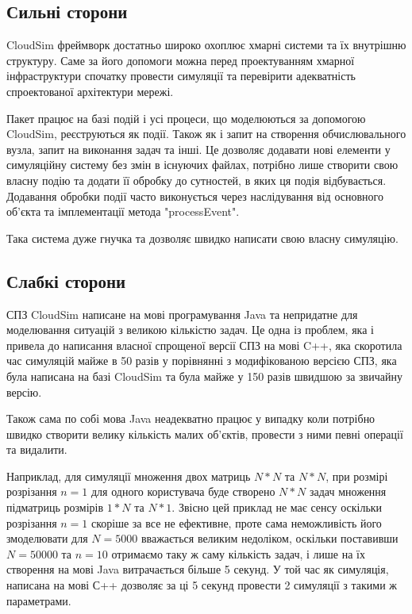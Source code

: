 \subsection{Сильні сторони}

CloudSim фреймворк \cite{CloudSim} достатньо широко охоплює хмарні системи та їх внутрішню структуру. Саме за його допомоги можна перед проектуванням хмарної інфраструктури спочатку провести симуляції та перевірити адекватність спроектованої архітектури мережі.

Пакет працює на базі подій і усі процеси, що моделюються за допомогою CloudSim, реєструються як події. Також як і запит на створення обчислювального вузла, запит на виконання задач та інші. Це дозволяє додавати нові елементи у симуляційну систему без змін в існуючих файлах, потрібно лише створити свою власну подію та додати її обробку до сутностей, в яких ця подія відбувається. Додавання обробки події часто виконується через наслідування від основного об'єкта та імплементації метода "processEvent".

Така система дуже гнучка та дозволяє швидко написати свою власну симуляцію.

\subsection{Слабкі сторони}

СПЗ CloudSim написане на мові програмування Java та непридатне для моделювання ситуацій з великою кількістю задач. Це одна із проблем, яка і привела до написання власної спрощеної версії СПЗ на мові C++, яка скоротила час симуляцій майже в 50 разів у порівнянні з модифікованою версією СПЗ, яка була написана на базі CloudSim та була майже у 150 разів швидшою за звичайну версію.

Також сама по собі мова Java неадекватно працює у випадку коли потрібно швидко створити велику кількість малих об'єктів, провести з ними певні операції та видалити.

Наприклад, для симуляції множення двох матриць $N*N$ та $N*N$, при розмірі розрізання $n=1$ для одного користувача буде створено $N*N$ задач множення підматриць розмірів $1*N$ та $N*1$. Звісно цей приклад не має сенсу оскільки розрізання $n=1$ скоріше за все не ефективне, проте сама неможливість його змоделювати для $N=5000$ вважається великим недоліком, оскільки поставивши $N=50000$ та $n=10$ отримаємо таку ж саму кількість задач, і лише на їх створення на мові Java витрачається більше 5 секунд. У той час як симуляція, написана на мові С++ дозволяє за ці 5 секунд провести 2 симуляції з такими ж параметрами.

